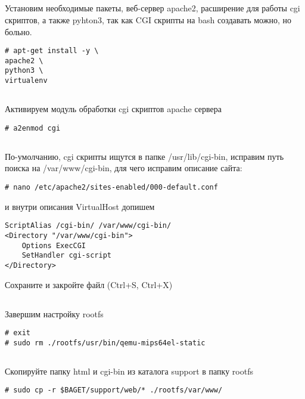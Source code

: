 \subsection{}Установим необходимые пакеты, веб-сервер apache2, расширение для работы cgi скриптов, а также pyhton3, так как CGI скрипты на bash создавать можно, но больно.
\begin{lstlisting}[style=bash]
# apt-get install -y \
apache2 \
python3 \
virtualenv
\end{lstlisting}

\subsection{}Активируем модуль обработки cgi скриптов apache сервера
\begin{lstlisting}[style=bash]
# a2enmod cgi
\end{lstlisting}

\subsection{}По-умолчанию, cgi скрипты ищутся в папке /usr/lib/cgi-bin, исправим путь поиска на /var/www/cgi-bin, для чего исправим описание сайта:
\begin{lstlisting}[style=bash]
# nano /etc/apache2/sites-enabled/000-default.conf
\end{lstlisting}
и внутри описания VirtualHost допишем
\begin{lstlisting}[style=stdout]
ScriptAlias /cgi-bin/ /var/www/cgi-bin/
<Directory "/var/www/cgi-bin">
	Options ExecCGI
	SetHandler cgi-script
</Directory>
\end{lstlisting}
Сохраните и закройте файл (Ctrl+S, Ctrl+X)

\subsection{}Завершим настройку rootfs
\begin{lstlisting}[style=bash]
# exit
# sudo rm ./rootfs/usr/bin/qemu-mips64el-static
\end{lstlisting}

\subsection{}Скопируйте папку html и cgi-bin из каталога support в папку rootfs
\begin{lstlisting}[style=bash]
# sudo cp -r $BAGET/support/web/* ./rootfs/var/www/
\end{lstlisting}

